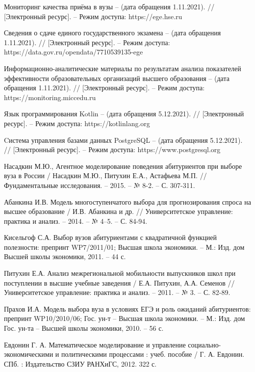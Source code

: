 \begin{thebibliography}{}
	Мониторинг качества приёма в вузы – (дата обращения 1.11.2021). // [Электронный ресурс]. – Режим доступа: https://ege.hse.ru

	Сведения о сдаче единого государственного экзамена – (дата обращения 1.11.2021). // [Электронный ресурс]. – Режим доступа: https://data.gov.ru/opendata/7710539135-ege

	Информационно-аналитические материалы по результатам анализа показателей эффективности образовательных организаций высшего образования – (дата обращения 1.11.2021). // [Электронный ресурс]. – Режим доступа: https://monitoring.miccedu.ru 

	Язык программирования Kotlin – (дата обращения 5.12.2021). // [Электронный ресурс]. – Режим доступа: https://kotlinlang.org

	Cистема управления базами данных PostgreSQL – (дата обращения 5.12.2021). // [Электронный ресурс]. – Режим доступа: https://www.postgresql.org

	Насадкин М.Ю., Агентное моделирование поведения абитуриентов при выборе вуза в России / Насадкин М.Ю., Питухин Е.А., Астафьева М.П. // Фундаментальные исследования. – 2015. – № 8-2. – С. 307-311.

	Абанкина И.В. Модель многоступенчатого выбора для прогнозирования спроса на высшее образование /
	И.В. Абанкина и др. // Университетское управление:
	практика и анализ. – 2014. – № 4–5. – С. 84-94.

	Кисельгоф С.А. Выбор вузов абитуриентами с квадратичной функцией полезности: препринт WP7/2011/01;
	Высшая школа экономики. – М.: Изд. дом Высшей школы экономики, 2011. – 44 с.

	Питухин Е.А. Анализ межрегиональной мобильности выпускников школ при поступлении в высшие учебные заведения 
	/ Е.А. Питухин, А.А. Семенов // Университетское управление: практика и анализ. – 2011. – № 3. – С. 82-89.

	Прахов И.А. Модель выбора вуза в условиях ЕГЭ и роль ожиданий абитуриентов: препринт WP10/2010/06;
	Гос. ун-т – Высшая школа экономики. – М.: Изд. дом Гос. ун-та – Высшей школы экономики, 2010. – 56 с.

	Евдонин Г. А. Математическое моделирование и управление социально-экономическими 
	и политическими процессами : учеб. пособие / Г. А. Евдонин. СПб. : Издательство СЗИУ 
	РАНХиГС, 2012. 322 с.


\end{thebibliography}
